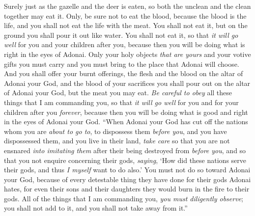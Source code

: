 \begin{biblechapter}
\verse Surely just as the gazelle and the deer is eaten, so both the unclean and the clean together may eat it.
\verse Only, be sure not to eat the blood, because the blood is the life, and you shall not eat the life with the meat.
\verse You shall not eat it, but on the ground you shall pour it out like water.
\verse You shall not eat it, so that \textit{it will go well} for you and your children after you, because then you will be doing what is right in the eyes of Adonai.
\verse Only your holy objects \textit{that are yours} and your votive gifts you must carry and you must bring to the place that Adonai will choose.
\verse And you shall offer your burnt offerings, the flesh and the blood on the altar of Adonai your God, and the blood of your sacrifices you shall pour out on the altar of Adonai your God, but the meat you may eat.
\verse \textit{Be careful to obey} all these things that I am commanding you, so that \textit{it will go well} for you and for your children after you \textit{forever}, because then you will be doing what is good and right in the eyes of Adonai your God.
\verse “When Adonai your God has cut off the nations whom you are \textit{about to go to}, to dispossess them \textit{before you}, and you have dispossessed them, and you live in their land,
\verse \textit{take care} so that you are not ensnared \textit{into imitating them} after their being destroyed from \textit{before you}, and so that you not enquire concerning their gods, \textit{saying}, ‘How did these nations serve their gods, and thus \textit{I myself} want to do also.’
\verse You must not do so toward Adonai your God, because of every detestable thing they have done for their gods Adonai hates, for even their sons and their daughters they would burn in the fire to their gods.
\verse {} All of the things that I am commanding you, \textit{you must diligently observe}; you shall not add to it, and you shall not take away from it.”
\end{biblechapter}

